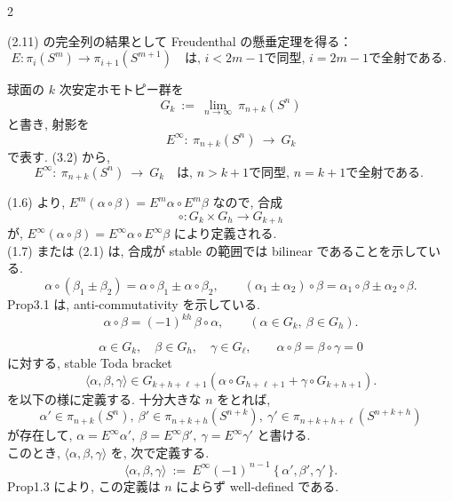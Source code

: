 \documentclass[10pt, leqno]{ltjsarticle}
\newcommand{\Ex}{E}        %
\newcommand{\toda}[1]{\{\,#1\,\}}              %
\newcommand{\pis}[2]{\pi_{#1}(#2)}       %
\numberwithin{equation}{section}
\theoremstyle{plain}
\theoremstyle{definition}
\theoremstyle{remark}
\begin{document}
\begin{paracol}{2}

\medskip
\noindent
(2.11) の完全列の結果として Freudenthal の懸垂定理を得る：
\begin{equation}\label{3.2}
\Ex: \pis{i}{S^m} \longrightarrow \pis{i+1}{S^{m+1}}
\quad\text{は, } i<2m-1 \text{で同型, } i=2m-1 \text{で全射である. }
\end{equation}

球面の $k$ 次安定ホモトピー群を
\[
G_k\ :=\ \lim_{n\to\infty}\ \pis{n+k}{S^n}
\]
と書き, 射影を
\[
\Ex^\infty:\ \pis{n+k}{S^n}\ \longrightarrow\ G_k
\]
で表す. (3.2) から,
\begin{equation}\label{3.3}
\Ex^\infty:\ \pis{n+k}{S^n}\ \xrightarrow{\;\;}\ G_k
\quad\text{は, } n>k+1 \text{で同型, } n=k+1 \text{で全射である. }
\end{equation}

(1.6) より,
\(\Ex^{m}(\alpha\circ\beta)=\Ex^{m}\alpha\circ\Ex^{m}\beta\)
なので, 合成
\[
\circ:G_k\times G_h \rightarrow G_{k+h}
\]
が, \(E^\infty(\alpha\circ\beta)=E^\infty\alpha\circ E^\infty\beta\) 
により定義される. \\
(1.7) または (2.1) は, 合成が stable の範囲では bilinear であることを示している. 
\[
\alpha\circ(\beta_1\pm\beta_2)=\alpha\circ\beta_1\pm\alpha\circ\beta_2,\qquad
(\alpha_1\pm\alpha_2)\circ\beta=\alpha_1\circ\beta\pm\alpha_2\circ\beta .
\]
Prop3.1 は, anti-commutativity を示している. 
\begin{equation}\label{3.4}
\alpha\circ\beta=(-1)^{kh}\,\beta\circ\alpha,
\qquad(\alpha\in G_k,\ \beta\in G_h) .
\end{equation}

\medskip
\noindent
\[
\alpha\in G_k,\quad \beta\in G_h,\quad \gamma\in G_\ell,\qquad
\alpha\circ\beta=\beta\circ\gamma=0
\]
に対する, stable Toda bracket 
\[
\langle \alpha,\beta,\gamma\rangle 
\in G_{k+h+\ell+1}(\alpha\circ G_{h+\ell+1} + \gamma\circ G_{k+h+1}) .
\]
を以下の様に定義する. 
十分大きな $n$ をとれば, 
\[
\alpha'\in\pis{n+k}{S^n},\ 
\beta'\in\pis{n+k+h}{S^{n+k}},\
\gamma'\in\pis{n+k+h+\ell}{S^{n+k+h}}
\]
が存在して, 
\(
\alpha=\Ex^\infty\alpha',\
\beta=\Ex^\infty\beta',\
\gamma=\Ex^\infty\gamma'
\)
と書ける. \\
このとき, 
\(\langle \alpha,\beta,\gamma\rangle\)
を, 次で定義する.
\[
\langle \alpha,\beta,\gamma\rangle
\ :=\ \Ex^\infty (-1)^{\,n-1}\ \toda{\alpha',\beta',\gamma'}.
\]
Prop1.3 により, この定義は $n$ によらず well-defined である. 

\switchcolumn


\end{paracol}
\end{document}
